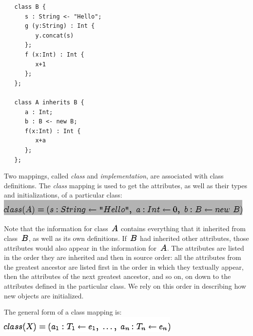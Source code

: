 \documentclass[]{article}
\begin{document}
\begin{verbatim}
   class B {
      s : String <- "Hello";
      g (y:String) : Int {
         y.concat(s)
      };
      f (x:Int) : Int {
         x+1
      };
   };

   class A inherits B {
      a : Int;
      b : B <- new B;
      f(x:Int) : Int {
         x+a
      };
   };
\end{verbatim}

Two mappings, called \emph{class} and \emph{implementation}, are
associated with class definitions. The \emph{class} mapping is used to
get the attributes, as well as their types and initializations, of a
particular class: \\

\includegraphics{img145.png}

Note that the information for class \includegraphics{img45.png} contains
everything that it inherited from class \includegraphics{img146.png}, as
well as its own definitions. If \includegraphics{img146.png} had
inherited other attributes, those attributes would also appear in the
information for \includegraphics{img45.png}. The attributes are listed
in the order they are inherited and then in source order: all the
attributes from the greatest ancestor are listed first in the order in
which they textually appear, then the attributes of the next greatest
ancestor, and so on, on down to the attributes defined in the particular
class. We rely on this order in describing how new objects are
initialized.

The general form of a class mapping is: \\

\includegraphics{img147.png}
\end{document}
